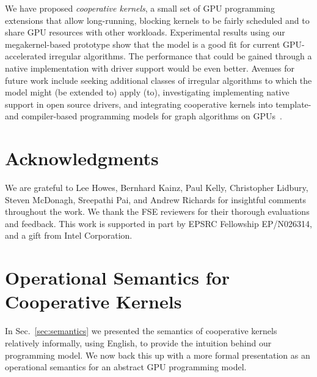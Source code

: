 \documentclass[sigconf]{acmart}
\newcommand{\mysec}{Sec.~}
\begin{document}
{We have proposed \emph{cooperative kernels}, a small set of GPU
programming extensions that allow long-running, blocking kernels to be
fairly scheduled and to share GPU resources with other workloads.
Experimental results using our megakernel-based prototype show that
the model is a good fit for current GPU-accelerated irregular
algorithms.  The performance that could be gained through a native
implementation with driver support would be even better.
%
Avenues for future work include seeking additional classes of
irregular algorithms to which the model might (be extended to) apply
(to), investigating implementing native support in open source
drivers, and integrating cooperative kernels into template- and
compiler-based programming models for graph algorithms on
GPUs~\cite{DBLP:conf/ppopp/WangDPWRO16,DBLP:conf/oopsla/PaiP16}.

\section*{Acknowledgments}
We are grateful to Lee Howes, Bernhard Kainz, Paul Kelly, Christopher
Lidbury, Steven McDonagh, Sreepathi Pai, and Andrew Richards for
insightful comments throughout the work. We thank the FSE reviewers
for their thorough evaluations and feedback. This work is supported in
part by EPSRC Fellowship EP/N026314, and a gift from Intel Corporation.



\clearpage




\iffalse


\clearpage

\appendix

\section{Operational Semantics for Cooperative Kernels}\label{appendix:semantics}

\newcommand{\myss}{\mathit{ss}}
\newcommand{\Stmts}{\mathsf{Stmts}}
\newcommand{\threadstates}{\mathsf{ThreadStates}}
\newcommand{\sharedstates}{\mathsf{SharedStates}}
\newcommand{\sync}{\mathsf{sync}}

In \mysec\ref{sec:semantics} we presented the semantics of cooperative
kernels relatively informally, using English, to provide the intuition
behind our programming model.  We now back this up with a more formal
presentation as an operational semantics for an abstract GPU
programming model.

}
\end{document}
